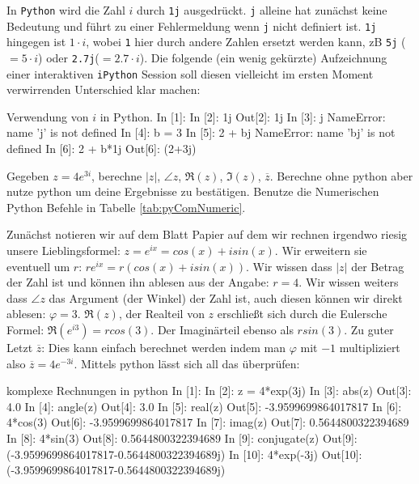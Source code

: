 In \texttt{Python} wird die Zahl $i$ durch \texttt{1j} ausgedrückt. \texttt{j} alleine hat zunächst keine Bedeutung und führt zu einer Fehlermeldung wenn \texttt{j} nicht definiert ist. \texttt{1j} hingegen ist $1\cdot i$, wobei \texttt{1} hier durch andere Zahlen ersetzt werden kann, zB \texttt{5j} ($=5\cdot i$) oder \texttt{2.7j}($=2.7 \cdot i$). Die folgende (ein wenig gekürzte) Aufzeichnung einer interaktiven \texttt{iPython} Session soll diesen vielleicht im ersten Moment verwirrenden Unterschied klar machen:

\begin{python}{Verwendung von $i$ in Python.}
In [1]: %
In [2]: 1j
Out[2]: 1j
In [3]: j
NameError: name 'j' is not defined
In [4]: b = 3
In [5]: 2 + bj
NameError: name 'bj' is not defined
In [6]: 2 + b*1j
Out[6]: (2+3j)
\end{python}




\begin{question}

Gegeben $z = 4e^{3i}$, berechne $|z|$, $\angle z$, $\Re (z)$, $\Im (z)$, $\overline{z}$. Berechne ohne python aber nutze python um deine Ergebnisse zu bestätigen. Benutze die Numerischen Python Befehle in Tabelle \ref{tab:pyComNumeric}.
\end{question}


\begin{answer}
	Zunächst notieren wir auf dem Blatt Papier auf dem wir rechnen irgendwo riesig unsere Lieblingsformel: $z = e^{ix} = cos(x) + i sin(x)$.
	Wir erweitern sie eventuell um $r$: $re^{ix} = r(cos(x) + i sin(x))$.
	Wir wissen dass $|z|$ der Betrag der Zahl ist und können ihn ablesen aus der Angabe: $r = 4$.
	Wir wissen weiters dass $\angle z$ das Argument (der Winkel) der Zahl ist, auch diesen können wir direkt ablesen: $\varphi = 3$.
	$\Re (z)$, der Realteil von $z$ erschließt sich durch die Eulersche Formel: $\Re (e^{i3}) = r cos(3)$. Der Imaginärteil ebenso als $r sin(3)$.
	Zu guter Letzt $\overline{z}$: Dies kann einfach berechnet werden indem man $\varphi$ mit $-1$ multipliziert also $\overline{z} = 4e^{-3i}$. 
	Mittels python lässt sich all das überprüfen:
	\begin{python}{komplexe Rechnungen in python}
In [1]: %
In [2]: z = 4*exp(3j)
In [3]: abs(z)
Out[3]: 4.0
In [4]: angle(z)
Out[4]: 3.0
In [5]: real(z)
Out[5]: -3.9599699864017817
In [6]: 4*cos(3)
Out[6]: -3.9599699864017817
In [7]: imag(z)
Out[7]: 0.5644800322394689
In [8]: 4*sin(3)
Out[8]: 0.5644800322394689
In [9]: conjugate(z)
Out[9]: (-3.9599699864017817-0.5644800322394689j)
In [10]: 4*exp(-3j)
Out[10]: (-3.9599699864017817-0.5644800322394689j)

	\end{python}


\end{answer}



